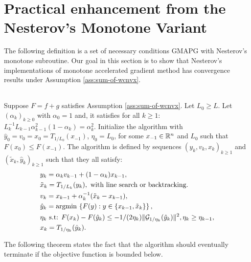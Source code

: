 \documentclass[12pt]{report}
\begin{document}
    \section{Practical enhancement from the Nesterov's Monotone Variant}
        The following definition is a set of necessary conditions GMAPG with Nesterov's monotone subroutine. 
        Our goal in this section is to show that Nesterov's implementations of monotone accelerated gradient method has convergence results under Assumption \ref{ass:sum-of-wcnvx}.
        \begin{definition}\;\label{def:nes-monotone-scheme}\\
            Suppose $F = f + g$ satisfies Assumption \ref{ass:sum-of-wcnvx}. 
            Let $L_0 \ge L$. 
            Let $(\alpha_k)_{k \ge 0}$ with $\alpha_0 = 1$ and, it satisfies for all $k \ge 1$: $L_{k}^{-1}L_{k - 1}\alpha_{k - 1}^2(1 - \alpha_k) = \alpha_k^2$. 
            Initialize the algorithm with $\hat y_0 =v_0=x_0 = T_{1/L_0}(x_{-1})$, $\eta_0 = L_0$, for some $x_{-1} \in \mathbb R^n$ and $L_0$ such that $F(x_0) \le F(x_{-1})$. 
            The algorithm is defined by sequences $(y_k, v_k, x_k)_{k \ge 1}$ and $(\tilde x_k, \hat y_k)_{k \ge 1}$ such that they all satisfy: 
            $$
            \begin{aligned}
                &y_k = \alpha_k v_{k - 1} + (1 - \alpha_k)x_{k - 1},
                \\
                &\tilde x_k = T_{1/L_k}(y_k), \text{ with line search or backtracking. }
                \\
                &v_k = x_{k - 1} + \alpha_k^{-1}(\tilde x_k - x_{k - 1}),
                \\
                &\hat y_k = \mathop{\rm argmin}\limits{}\left\lbrace
                    F(y): y \in \{x_{k - 1}, \tilde x_k\}
                \right\rbrace,
                \\
                & \eta_{k}\text{ s.t: } F(x_k) - F(\hat y_k) \le - 1/(2\eta_k)\Vert \mathcal G_{1/\eta_k}(\hat y_k) \Vert^2, \eta_{k} \ge \eta_{k - 1}, 
                \\
                &x_k = T_{1/\eta_k}(\hat y_k) . 
            \end{aligned}
            $$
        \end{definition}
        The following theorem states the fact that the algorithm should eventually terminate if the objective function is bounded below. 
\end{document}
